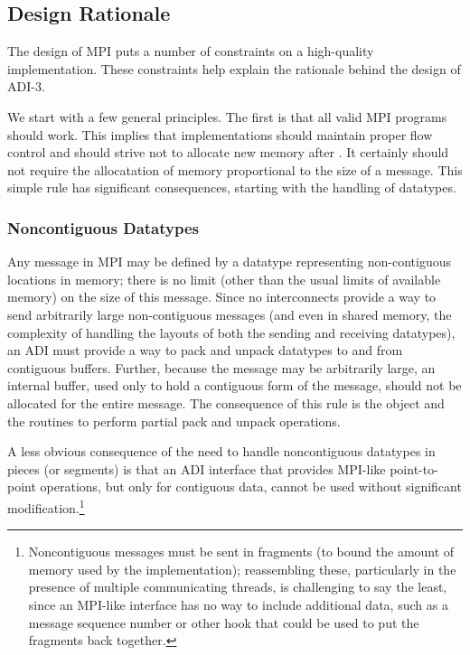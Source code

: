 \documentclass{article}
\begin{document}
\subsection{Design Rationale}
\label{sec-intermediate}
\label{sec-rationale}
The design of MPI puts a number of constraints on a high-quality
implementation.  These constraints help explain the rationale behind
the design of ADI-3.

We start with a few general principles.  The first is that all valid
MPI programs should work.  This implies that implementations should
maintain proper flow control and should strive not to allocate new
memory after .  It certainly should not require
the allocatation of memory proportional to the size of a message.
This simple rule has significant consequences, starting with the
handling of datatypes.

\subsubsection{Noncontiguous Datatypes}
Any message in MPI may be defined by a datatype representing
non-contiguous locations in memory; there is no limit (other than the
usual limits of available memory) on the size of this message.  Since
no interconnects provide a way to send arbitrarily large
non-contiguous messages (and even in shared memory, the complexity of
handling the layouts of both the sending and receiving datatypes), an
ADI must provide a way to pack and unpack datatypes to and from
contiguous buffers.  
Further, because the message may be arbitrarily large, an internal
buffer,
used only to hold a contiguous form of the message, should
not be allocated for the entire message.
The consequence of this rule is the  object and the
routines to perform partial pack and unpack operations.

A less obvious consequence of the need to handle noncontiguous
datatypes in pieces (or segments) is that an ADI interface that
provides MPI-like point-to-point operations, but only for contiguous
data, cannot be used without significant modification.\footnote{Noncontiguous
  messages must be sent in fragments (to bound the amount of memory
  used by the implementation); reassembling these, particularly in the
  presence of multiple communicating threads, is challenging to say the least,
  since an MPI-like interface has no way to include additional data, such as a
  message sequence number or other hook that could be used to put the
  fragments back together.}
\end{document}
